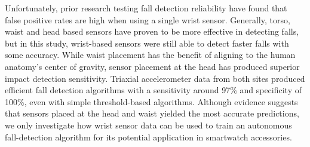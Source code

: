 \documentclass{llncs}
\begin{document}
	Unfortunately, prior research testing fall detection reliability have found that false positive rates are high when using a single wrist sensor.\cite{gjoreski2016accurately} Generally, torso, waist and head based sensors have proven to be more effective in detecting falls, but in this study, wrist-based sensors were still able to detect faster falls with some accuracy. While waist placement has the benefit of aligning to the human anatomy's center of gravity, sensor placement at the head has produced superior impact detection sensitivity. Triaxial accelerometer data from both sites produced efficient fall detection algorithms with a sensitivity around 97\% and specificity of 100\%, even with simple threshold-based algorithms.\cite{kangas2008comparison} Although evidence suggests that sensors placed at the head and waist yielded the most accurate predictions, we only investigate how wrist sensor data can be used to train an autonomous fall-detection algorithm for its potential application in smartwatch accessories.
	
	
\end{document}

